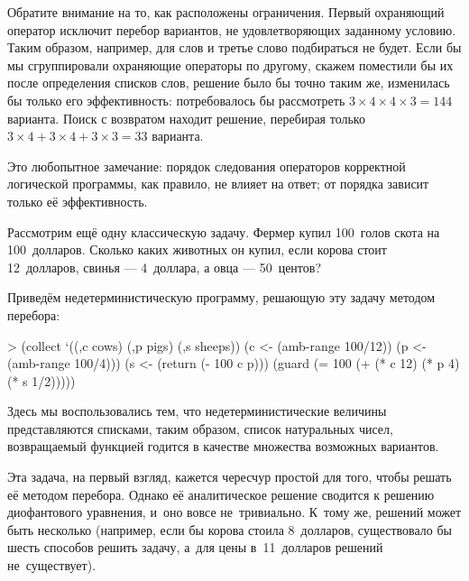 Обратите внимание на то, как расположены ограничения. Первый охраняющий оператор  исключит перебор вариантов, не удовлетворяющих заданному условию. Таким образом, например, для слов  и  третье слово подбираться не будет. Если бы мы сгруппировали охраняющие операторы по другому, скажем поместили бы их после определения списков слов, решение было бы точно таким же, изменилась бы только его эффективность: потребовалось бы рассмотреть $3\times4\times4\times3=144$ варианта. Поиск с возвратом находит решение, перебирая только $3\times4+3\times4+3\times3=33$ варианта.

Это любопытное замечание: порядок следования операторов корректной логической программы, как правило, не влияет на ответ; от порядка зависит только её эффективность.

Рассмотрим ещё одну классическую задачу. Фермер купил 100~голов скота на 100~долларов. Сколько каких животных он купил, если корова стоит 12~долларов, свинья --- 4~доллара, а овца --- 50~центов?

Приведём недетерминистическую программу, решающую эту задачу методом перебора:

\begin{SchemeCode}[emph={c,p,s}]
   > (collect `((,c cows) (,p pigs) (,s sheeps))
      (c <- (amb-range 100/12))
      (p <- (amb-range 100/4)))
      (s <- (return (- 100 c p)))
      (guard (= 100 (+ (* c 12) (* p 4) (* s 1/2)))))
\end{SchemeCode}

Здесь мы воспользовались тем, что недетерминистические величины представляются списками, таким образом, список натуральных чисел, возвращаемый функцией  годится в качестве множества возможных вариантов.

Эта задача, на первый взгляд, кажется чересчур простой для того, чтобы решать её методом перебора. Однако её аналитическое решение сводится к решению диофантового уравнения, и~оно вовсе не~тривиально. К~тому же, решений может быть несколько (например, если бы корова стоила 8~долларов, существовало бы шесть способов решить задачу, а~для цены в~11~долларов решений не~существует).

